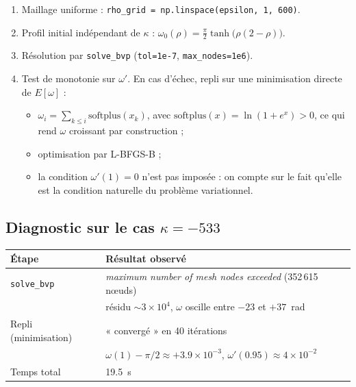 \documentclass[11pt,a4paper]{article}
\begin{document}
\begin{enumerate}
  \item Maillage uniforme : \texttt{rho\_grid = np.linspace(epsilon, 1, 600)}.
  \item Profil initial indépendant de $\kappa$ :
        $\omega_0(\rho) = \frac{\pi}{2}\tanh\!\big(\rho(2-\rho)\big)$.
  \item Résolution par \texttt{solve\_bvp} (\texttt{tol=1e-7}, \texttt{max\_nodes=1e6}).
  \item Test de monotonie sur $\omega'$. En cas d'échec, repli sur une
        minimisation directe de $E[\omega]$ :
        \begin{itemize}
          \item $\omega_i = \sum_{k\le i}\mathrm{softplus}(x_k)$, avec
                $\mathrm{softplus}(x) = \ln(1+e^{x}) > 0$, ce qui rend $\omega$
                croissant par construction ;
          \item optimisation par L-BFGS-B ;
          \item la condition $\omega'(1)=0$ n'est pas imposée : on compte sur
                le fait qu'elle est la condition naturelle du problème
                variationnel.
        \end{itemize}
\end{enumerate}

\subsection{Diagnostic sur le cas $\kappa=-533$}

\begin{center}
\begin{tabular}{@{}ll@{}}
\toprule
Étape & Résultat observé \\
\midrule
\texttt{solve\_bvp} & \emph{maximum number of mesh nodes exceeded}
                      (352\,615 nœuds) \\
                    & résidu $\sim 3\times10^{4}$,
                      $\omega$ oscille entre $-23$ et $+37$~rad \\
Repli (minimisation) & « convergé » en 40 itérations \\
                     & $\omega(1)-\pi/2 \approx +3.9\times10^{-3}$,
                       $\omega'(0.95)\approx 4\times10^{-2}$ \\
Temps total & 19.5~s \\
\bottomrule
\end{tabular}
\end{center}
\end{document}
